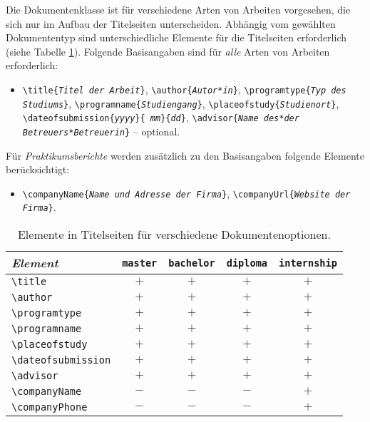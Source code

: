 Die Dokumentenklasse ist für verschiedene Arten von Arbeiten vorgesehen, die
sich nur im Aufbau der Titelseiten unterscheiden. Abhängig vom gewählten
Dokumententyp sind unterschiedliche Elemente für die Titelseiten erforderlich
(siehe Tabelle \ref{tab:TitelElemente}). Folgende Basisangaben sind für
\emph{alle} Arten von Arbeiten erforderlich:
%
\begin{itemize}
    \item[] %
    \verb!\title{!\texttt{\em Titel der Arbeit}\verb!}!, \newline%
    \verb!\author{!\texttt{\em Autor*in}\verb!}!, \newline%
    \verb!\programtype{!\texttt{\em Typ des Studiums}\verb!}!, \newline%
    \verb!\programname{!\texttt{\em Studiengang}\verb!}!, \newline%
    \verb!\placeofstudy{!\texttt{\em Studienort}\verb!}!, \newline%
    \verb!\dateofsubmission{!\texttt{\em yyyy}\verb!}{!\texttt{\em
    mm}\verb!}{!\texttt{\em dd}\verb!}!, \newline%
    \verb!\advisor{!\texttt{\em Name des*der Betreuers*Betreuerin}\verb!}! --
    optional.
\end{itemize}
%
\noindent
Für \emph{Praktikumsberichte} werden zusätzlich zu den Basisangaben
folgende Elemente berücksichtigt:
%
\begin{itemize}
    \item[] %
    \verb!\companyName{!\texttt{\em Name und Adresse der Firma}\verb!}!,
    \newline%
    \verb!\companyUrl{!\texttt{\em Website der Firma}\verb!}!.
\end{itemize}

\begin{table}
    \caption{Elemente in Titelseiten für verschiedene Dokumentenoptionen.}
    \label{tab:TitelElemente}
    \centering\small
    \begin{tabular}{@{}lcccc@{}}
        \toprule
        \emph{Element} & \texttt{master} & \texttt{bachelor} & 
				\texttt{diploma} & \texttt{internship} \\
        \midrule
        \verb!\title!            & $+$ & $+$ & $+$ & $+$ \\
        \verb!\author!           & $+$ & $+$ & $+$ & $+$ \\
        \verb!\programtype!      & $+$ & $+$ & $+$ & $+$ \\
        \verb!\programname!      & $+$ & $+$ & $+$ & $+$ \\
        \verb!\placeofstudy!     & $+$ & $+$ & $+$ & $+$ \\
        \verb!\dateofsubmission! & $+$ & $+$ & $+$ & $+$ \\
        \verb!\advisor!          & $+$ & $+$ & $+$ & $+$ \\
        \verb!\companyName!      & $-$ & $-$ & $-$ & $+$ \\
        \verb!\companyPhone!     & $-$ & $-$ & $-$ & $+$ \\
        \bottomrule
    \end{tabular}
\end{table}

